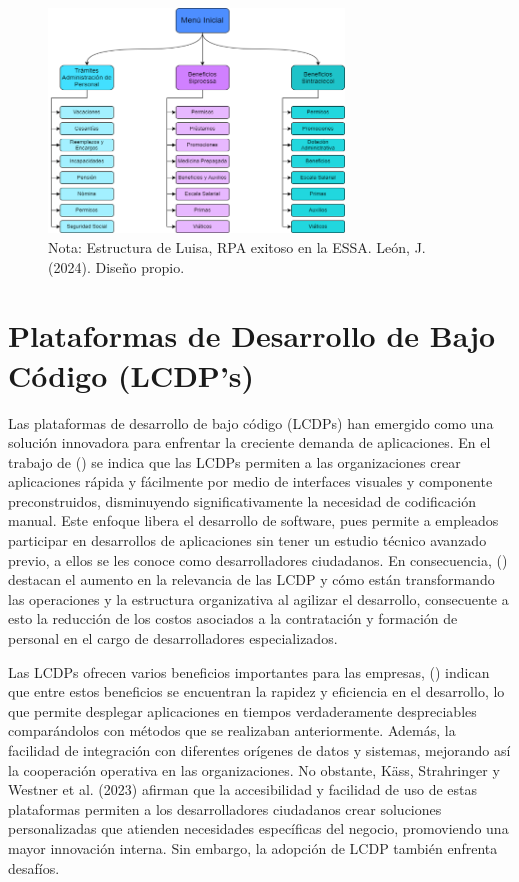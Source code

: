\documentclass[letter,oneside,12pt,spanish]{report}
\begin{document}
\begin{figure}[ht]
    \centering
    \includegraphics[width=0.7\textwidth]{Figs/estructura luisa.png}
    \label{fig:LuisaEstructura}
    \\Nota: Estructura de Luisa, RPA exitoso en la ESSA. León, J. (2024). Diseño propio.
\end{figure}


\section{Plataformas de Desarrollo de Bajo Código (LCDP's)}

\noindent Las plataformas de desarrollo de bajo código (LCDPs) han emergido como una solución innovadora para enfrentar la creciente demanda de aplicaciones. En el trabajo de (\cite{alsaadi2021lcdp}) se indica que las LCDPs permiten a las organizaciones crear aplicaciones rápida y fácilmente por medio de interfaces visuales y componente preconstruidos, disminuyendo significativamente la necesidad de codificación manual. Este enfoque libera el desarrollo de software, pues permite a empleados participar en desarrollos de aplicaciones sin tener un estudio técnico avanzado previo, a ellos se les conoce como desarrolladores ciudadanos. En consecuencia, (\cite{prinz2021lcdp}) destacan el aumento en la relevancia de las LCDP y cómo están transformando las operaciones y la estructura organizativa al agilizar el desarrollo, consecuente a esto la reducción de los costos asociados a la contratación y formación de personal en el cargo de desarrolladores especializados.

\noindent Las LCDPs ofrecen varios beneficios importantes para las empresas, (\cite{sharma2023appsmith}) indican que entre estos beneficios se encuentran la rapidez y eficiencia en el desarrollo, lo que permite desplegar aplicaciones en tiempos verdaderamente despreciables comparándolos con métodos que se realizaban anteriormente. Además, la facilidad de integración con diferentes orígenes de datos y sistemas, mejorando así la cooperación operativa en las organizaciones. No obstante, Käss, Strahringer y Westner et al. (2023) afirman que la accesibilidad y facilidad de uso de estas plataformas permiten a los desarrolladores ciudadanos crear soluciones personalizadas que atienden necesidades específicas del negocio, promoviendo una mayor innovación interna. Sin embargo, la adopción de LCDP también enfrenta desafíos. 
\end{document}
